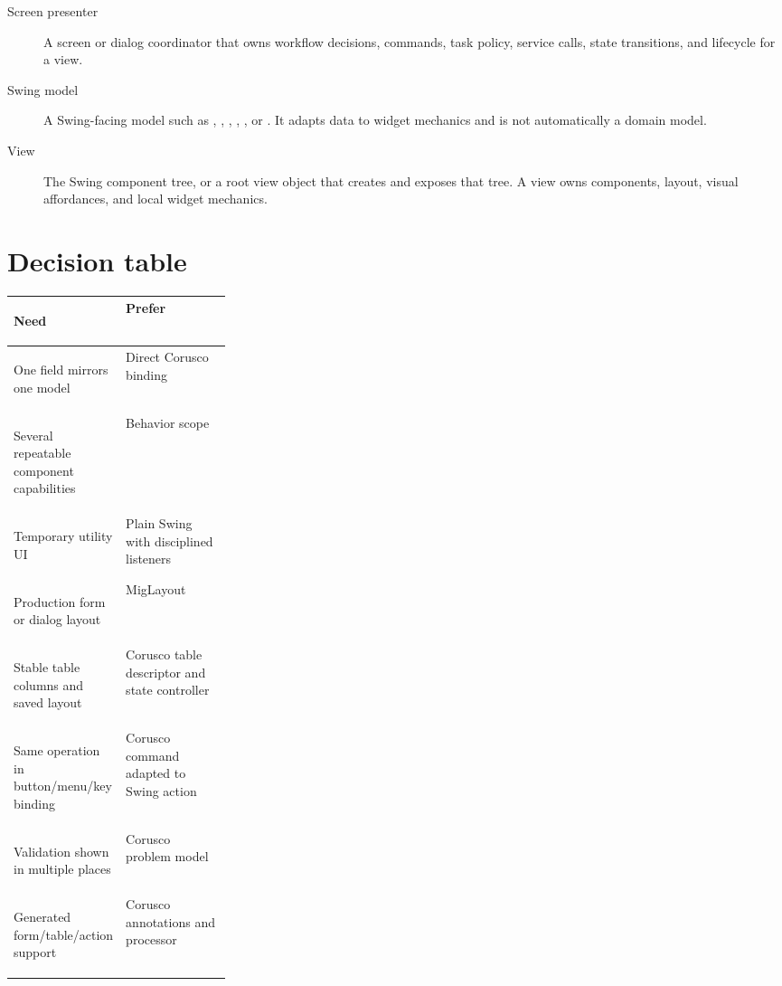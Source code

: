 \begin{description}
\item[Screen presenter] A screen or dialog coordinator that owns workflow decisions, commands, task policy, service calls, state transitions, and lifecycle for a view.
\item[Swing model] A Swing-facing model such as , , , , , or . It adapts data to widget mechanics and is not automatically a domain model.
\item[View] The Swing component tree, or a root view object that creates and exposes that tree. A view owns components, layout, visual affordances, and local widget mechanics.
\end{description}

\section*{Decision table}

\begin{center}\small
\begin{tabularx}{0.96\linewidth}{>{\bfseries\raggedright\arraybackslash}p{0.28\linewidth}X}
\toprule
Need & Prefer\\
\midrule
One field mirrors one model & Direct Corusco binding\\
Several repeatable component capabilities & Behavior scope\\
Temporary utility UI & Plain Swing with disciplined listeners\\
Production form or dialog layout & MigLayout\\
Stable table columns and saved layout & Corusco table descriptor and state controller\\
Same operation in button/menu/key binding & Corusco command adapted to Swing action\\
Validation shown in multiple places & Corusco problem model\\
Generated form/table/action support & Corusco annotations and processor\\
\bottomrule
\end{tabularx}
\end{center}
